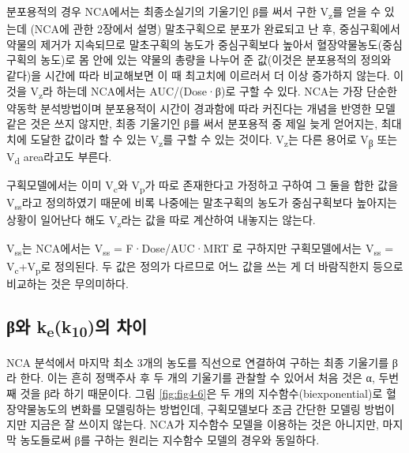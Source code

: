 \documentclass[
  11pt,
  krantz2, a4paper, twoside]{krantz}
\theoremstyle{definition}
\theoremstyle{definition}
\theoremstyle{definition}
\theoremstyle{definition}
\theoremstyle{remark}
\begin{document}
분포용적의 경우 NCA에서는 최종소실기의 기울기인 β를 써서 구한 V\textsubscript{z}를
얻을 수 있는데 (NCA에 관한 2장에서 설명) 말초구획으로 분포가 완료되고 난
후, 중심구획에서 약물의 제거가 지속되므로 말초구획의 농도가 중심구획보다
높아서 혈장약물농도(중심구획의 농도)로 몸 안에 있는 약물의 총량을 나누어
준 값(이것은 분포용적의 정의와 같다)을 시간에 따라 비교해보면 이 때
최고치에 이르러서 더 이상 증가하지 않는다. 이것을 V\textsubscript{z}라 하는데
NCA에서는 AUC/(Dose·β)로 구할 수 있다. NCA는 가장 단순한 약동학
분석방법이며 분포용적이 시간이 경과함에 따라 커진다는 개념을 반영한 모델
같은 것은 쓰지 않지만, 최종 기울기인 β를 써서 분포용적 중 제일 늦게
얻어지는, 최대치에 도달한 값이라 할 수 있는 V\textsubscript{z}를 구할 수 있는 것이다. V\textsubscript{z}는 다른
용어로 V\textsubscript{β} 또는 V\textsubscript{d} area라고도 부른다.

구획모델에서는 이미 V\textsubscript{c}와 V\textsubscript{p}가 따로 존재한다고 가정하고 구하여 그
둘을 합한 값을 V\textsubscript{ss}라고 정의하였기 때문에 비록 나중에는 말초구획의
농도가 중심구획보다 높아지는 상황이 일어난다 해도 V\textsubscript{z}라는 값을 따로
계산하여 내놓지는 않는다.

V\textsubscript{ss}는 NCA에서는 V\textsubscript{ss} = F·Dose/AUC·MRT 로 구하지만 구획모델에서는
V\textsubscript{ss} = V\textsubscript{c}+V\textsubscript{p}로 정의된다. 두 값은 정의가 다르므로 어느 값을 쓰는 게
더 바람직한지 등으로 비교하는 것은 무의미하다.

\hypertarget{ux3b2uxc640-kek10uxc758-uxcc28uxc774}{%
\subsection{\texorpdfstring{β와 k\textsubscript{e}(k\textsubscript{10})의 차이}{β와 ke(k10)의 차이}}\label{ux3b2uxc640-kek10uxc758-uxcc28uxc774}}

NCA 분석에서 마지막 최소 3개의 농도를 직선으로 연결하여 구하는 최종 기울기를 β라 한다.
이는 흔히 정맥주사 후 두 개의 기울기를 관찰할 수 있어서 처음 것은 α, 두번째 것을 β라 하기 때문이다.
그림 \ref{fig:fig4-6}은 두 개의 지수함수(biexponential)로 혈장약물농도의 변화를 모델링하는 방법인데, 구획모델보다 조금 간단한 모델링 방법이지만 지금은 잘 쓰이지 않는다.
NCA가 지수함수 모델을 이용하는 것은 아니지만, 마지막 농도들로써 β를 구하는 원리는 지수함수 모델의 경우와 동일하다.
\end{document}
